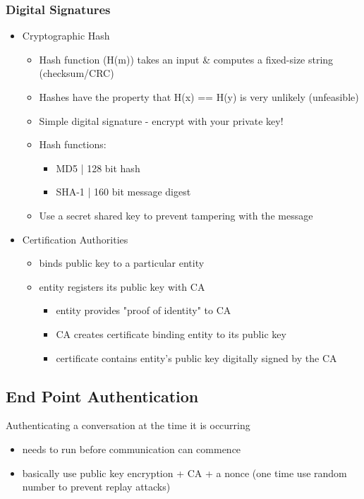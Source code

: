 \documentclass{article}
\begin{document}
\subsubsection*{Digital Signatures}

\begin{itemize}
	\item Cryptographic Hash
	\begin{itemize}
		\item Hash function (H(m)) takes an input \& computes a fixed-size string (checksum/CRC)
		\item Hashes have the property that H(x) == H(y) is very unlikely (unfeasible)
		\item Simple digital signature - encrypt with your private key!
		\item Hash functions:
		\begin{itemize}
			\item MD5 | 128 bit hash
			\item SHA-1 | 160 bit message digest
		\end{itemize}
		\item Use a secret shared key to prevent tampering with the message
	\end{itemize}
	
	\item Certification Authorities
	\begin{itemize}
		\item binds public key to a particular entity
		\item entity registers its public key with CA
		\begin{itemize}
			\item entity provides "proof of identity" to CA
			\item CA creates certificate binding entity to its public key
			\item certificate contains entity's public key digitally signed by the CA
		\end{itemize}
	\end{itemize}
\end{itemize}

\subsection{End Point Authentication}

Authenticating a conversation at the time it is occurring

\begin{itemize}
	\item needs to run before communication can commence
	\item basically use public key encryption + CA + a nonce (one time use random number to prevent replay attacks)
\end{itemize}
\end{document}
